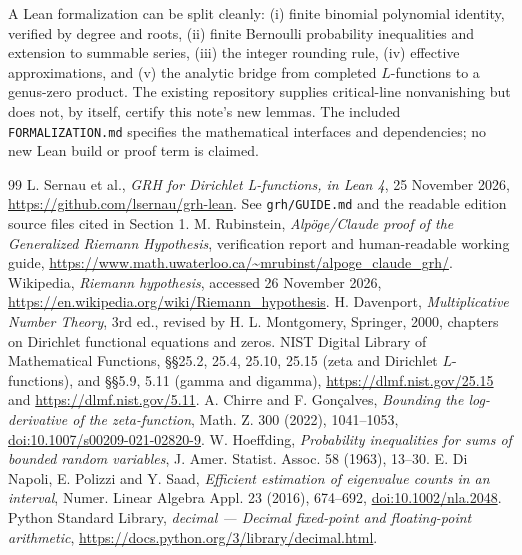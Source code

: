 \documentclass[11pt]{article}
\theoremstyle{remark}\newtheorem{remark}[theorem]{Remark}
\begin{document}
A Lean formalization can be split cleanly: (i) finite binomial polynomial identity, verified by degree and roots, (ii) finite Bernoulli probability inequalities and extension to summable series, (iii) the integer rounding rule, (iv) effective approximations, and (v) the analytic bridge from completed $L$-functions to a genus-zero product. The existing repository supplies critical-line nonvanishing but does not, by itself, certify this note's new lemmas. The included \texttt{FORMALIZATION.md} specifies the mathematical interfaces and dependencies; no new Lean build or proof term is claimed.

\begin{thebibliography}{99}\small
{} L. Sernau et al., \emph{GRH for Dirichlet L-functions, in Lean 4}, 25 November 2026, \url{https://github.com/lsernau/grh-lean}. See \texttt{grh/GUIDE.md} and the readable edition source files cited in Section 1.
 M. Rubinstein, \emph{Alp\"oge/Claude proof of the Generalized Riemann Hypothesis}, verification report and human-readable working guide, \url{https://www.math.uwaterloo.ca/~mrubinst/alpoge_claude_grh/}.
 Wikipedia, \emph{Riemann hypothesis}, accessed 26 November 2026, \url{https://en.wikipedia.org/wiki/Riemann_hypothesis}.
 H. Davenport, \emph{Multiplicative Number Theory}, 3rd ed., revised by H. L. Montgomery, Springer, 2000, chapters on Dirichlet functional equations and zeros.
 NIST Digital Library of Mathematical Functions, \S\S 25.2, 25.4, 25.10, 25.15 (zeta and Dirichlet $L$-functions), and \S\S 5.9, 5.11 (gamma and digamma), \url{https://dlmf.nist.gov/25.15} and \url{https://dlmf.nist.gov/5.11}.
 A. Chirre and F. Gon\c{c}alves, \emph{Bounding the log-derivative of the zeta-function}, Math. Z. 300 (2022), 1041--1053, \href{https://doi.org/10.1007/s00209-021-02820-9}{doi:10.1007/s00209-021-02820-9}.
 W. Hoeffding, \emph{Probability inequalities for sums of bounded random variables}, J. Amer. Statist. Assoc. 58 (1963), 13--30.
 E. Di Napoli, E. Polizzi and Y. Saad, \emph{Efficient estimation of eigenvalue counts in an interval}, Numer. Linear Algebra Appl. 23 (2016), 674--692, \href{https://doi.org/10.1002/nla.2048}{doi:10.1002/nla.2048}.
 Python Standard Library, \emph{decimal --- Decimal fixed-point and floating-point arithmetic}, \url{https://docs.python.org/3/library/decimal.html}.
\end{thebibliography}
\end{document}
